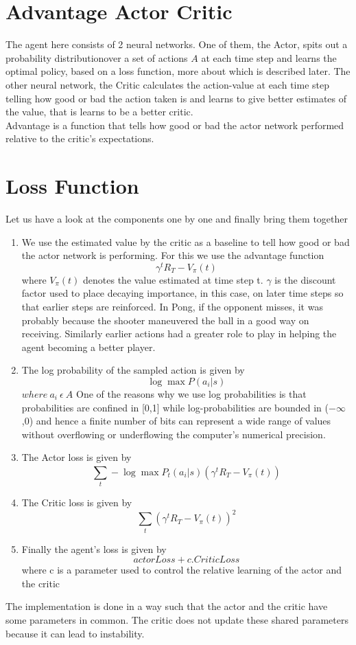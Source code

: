 \documentclass[12pt,a4paper]{article}
\begin{document}
\section*{Advantage Actor Critic}
The agent here consists of 2 neural networks. One of them, the Actor, spits out a probability distributionover a set of actions \(A\) at each time step and learns the optimal policy, based on a loss function, more about which is described later. The other neural network, the Critic calculates the action-value at each time step telling how good or bad the action taken is and learns to give better estimates of the value, that is learns to be a better critic.\\
Advantage is a function that tells how good or bad the actor network performed relative to the critic's expectations.

\section*{Loss Function}
Let us have a look at the components one by one and finally bring them together
\begin{enumerate}
\item We use the estimated value by the critic as a baseline to tell how good or bad the actor network is performing. For this we use the advantage function
\[\gamma ^{t}R_{T} - V_{\pi}(t)\]
where \(V_{\pi}(t)\) denotes the value estimated at time step t. \(\gamma\) is the discount factor used to place decaying importance, in this case, on later time steps so that earlier steps are reinforced. In Pong, if the opponent misses, it was probably because the shooter maneuvered the ball in a good way on receiving. Similarly earlier actions had a greater role to play in helping the agent becoming a better player.

\item The log probability of the sampled action is given by
\[\log \max P(a_{i}|s)\] \(where\ a_{i}\ \epsilon\ A\)
One of the reasons why we use log probabilities is that probabilities are confined in [0,1] while log-probabilities are bounded in (\(-\infty\),0) and hence a finite number of bits can represent a wide range of values without overflowing or underflowing the computer's numerical precision.   
\item The Actor loss is given by
\[\sum_{t}^{}-\log \max P_{t}(a_{i}|s)(\gamma ^{t}R_{T} - V_{\pi}(t))\]
\item The Critic loss is given by
\[\sum_{t}(\gamma ^{t}R_{T} - V_{\pi}(t))^{2}\]
\item Finally the agent's loss is given by
\[actorLoss + c.CriticLoss\]
where c is a parameter used to control the relative learning of the actor and the critic
\end{enumerate}
The implementation is done in a way such that the actor and the critic have some parameters in common. The critic does not update these shared parameters because it can lead to instability.
\end{document}
